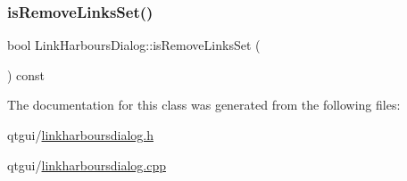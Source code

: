 \subsubsection{\texorpdfstring{isRemoveLinksSet()}{isRemoveLinksSet()}}
{\footnotesize\ttfamily bool Link\+Harbours\+Dialog\+::is\+Remove\+Links\+Set (\begin{DoxyParamCaption}{ }\end{DoxyParamCaption}) const}



The documentation for this class was generated from the following files\+:\begin{DoxyCompactItemize}
\item 
qtgui/\mbox{\hyperlink{linkharboursdialog_8h}{linkharboursdialog.\+h}}\item 
qtgui/\mbox{\hyperlink{linkharboursdialog_8cpp}{linkharboursdialog.\+cpp}}\end{DoxyCompactItemize}
